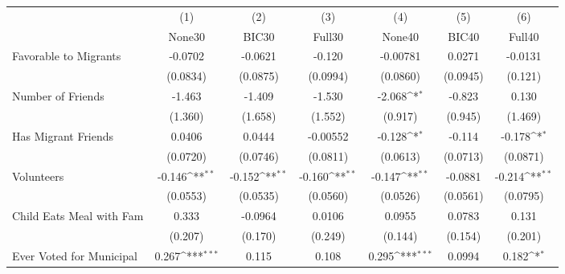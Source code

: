 {
\def\sym#1{\ifmmode^{#1}\else\(^{#1}\)\fi}
\begin{tabular}{l*{6}{c}}
\toprule
            &\multicolumn{1}{c}{(1)}&\multicolumn{1}{c}{(2)}&\multicolumn{1}{c}{(3)}&\multicolumn{1}{c}{(4)}&\multicolumn{1}{c}{(5)}&\multicolumn{1}{c}{(6)}\\
            &\multicolumn{1}{c}{None30}&\multicolumn{1}{c}{BIC30}&\multicolumn{1}{c}{Full30}&\multicolumn{1}{c}{None40}&\multicolumn{1}{c}{BIC40}&\multicolumn{1}{c}{Full40}\\
\midrule
Favorable to Migrants&     -0.0702         &     -0.0621         &      -0.120         &    -0.00781         &      0.0271         &     -0.0131         \\
            &    (0.0834)         &    (0.0875)         &    (0.0994)         &    (0.0860)         &    (0.0945)         &     (0.121)         \\
\addlinespace
Number of Friends&      -1.463         &      -1.409         &      -1.530         &      -2.068\sym{*}  &      -0.823         &       0.130         \\
            &     (1.360)         &     (1.658)         &     (1.552)         &     (0.917)         &     (0.945)         &     (1.469)         \\
\addlinespace
Has Migrant Friends&      0.0406         &      0.0444         &    -0.00552         &      -0.128\sym{*}  &      -0.114         &      -0.178\sym{*}  \\
            &    (0.0720)         &    (0.0746)         &    (0.0811)         &    (0.0613)         &    (0.0713)         &    (0.0871)         \\
\addlinespace
Volunteers  &      -0.146\sym{**} &      -0.152\sym{**} &      -0.160\sym{**} &      -0.147\sym{**} &     -0.0881         &      -0.214\sym{**} \\
            &    (0.0553)         &    (0.0535)         &    (0.0560)         &    (0.0526)         &    (0.0561)         &    (0.0795)         \\
\addlinespace
Child Eats Meal with Fam&       0.333         &     -0.0964         &      0.0106         &      0.0955         &      0.0783         &       0.131         \\
            &     (0.207)         &     (0.170)         &     (0.249)         &     (0.144)         &     (0.154)         &     (0.201)         \\
\addlinespace
Ever Voted for Municipal&       0.267\sym{***}&       0.115         &       0.108         &       0.295\sym{***}&      0.0994         &       0.182\sym{*}  \\

\end{tabular}}
